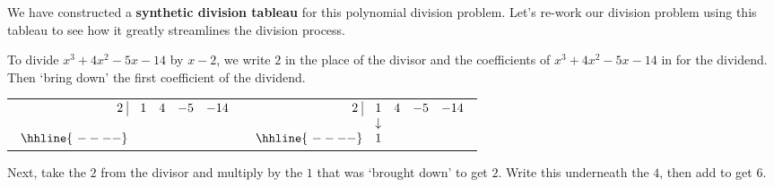 We have constructed a \textbf{synthetic division tableau} for this polynomial division problem.  Let's re-work our division problem using this tableau to see how it greatly streamlines the division process.  

\medskip

To divide $x^3+4x^2-5x-14$ by $x-2$, we write $2$ in the place of the divisor and the coefficients of $x^3+4x^2-5x-14$ in for the dividend.  Then `bring down' the first coefficient of the dividend.

\bigskip

\begin{center}

\begin{tabular}{cc}

$ \begin{array}{rrrrr}


  2 \, \, \vline& 1 & 4 & -5  & -14 \\

   &  &    &    &  \\ \hhline{~----} 
  &   &     &   &    \\  
\end{array}$  \hspace{1in}
&


$ \begin{array}{rrrrr}


  2 \, \, \vline& 1 & 4 & -5  & -14 \\

   & \downarrow &    &    &  \\ \hhline{~----} 
  & 1  &     &   &    \\  
\end{array}$ \\

\end{tabular}

\end{center}

\bigskip

Next, take the $2$ from the divisor and multiply by the $1$ that was `brought down' to get $2$.  Write this underneath the $4$, then add to get $6$.

\bigskip

